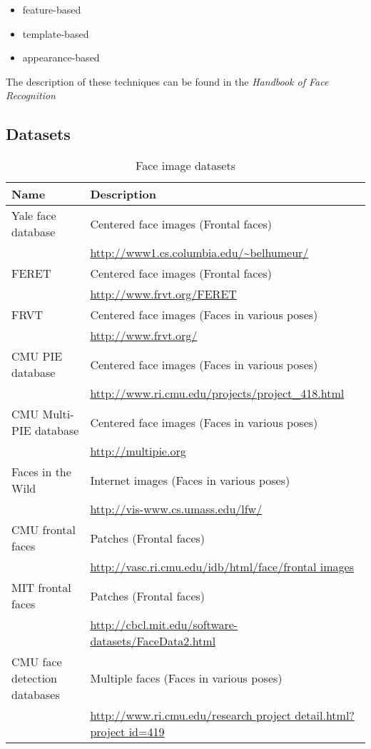 \documentclass[11pt]{article} %
\theoremstyle{plain}
\theoremstyle{definition}
\theoremstyle{remark}
\numberwithin{equation}{section} %
\numberwithin{figure}{section} %
\numberwithin{table}{section} %
\begin{document}
\begin{itemize}
  \item feature-based
  \item template-based
  \item appearance-based 
\end{itemize}

The description of these techniques can be found in the \emph{Handbook of Face Recognition} \citep{jain2005handbook}


\subsection{Datasets}

\begin{table}[H]
  \centering
  \caption{Face image datasets}
  \label{tab:datasets}
  \begin{tabular}{ l p{10cm} }
    Name & Description \\ 
    \hline
    Yale face database & Centered face images (Frontal faces) \\
    & \url{http://www1.cs.columbia.edu/~belhumeur/} \\
    FERET & Centered face images (Frontal faces) \\
    & \url{http://www.frvt.org/FERET} \\
    FRVT & Centered face images (Faces in various poses) \\
    & \url{http://www.frvt.org/} \\
    CMU PIE database & Centered face images (Faces in various poses) \\
    & \url{http://www.ri.cmu.edu/projects/project_418.html} \\
    CMU Multi-PIE database & Centered face images (Faces in various poses) \\
    & \url{http://multipie.org} \\
    Faces in the Wild & Internet images (Faces in various poses) \\
    & \url{http://vis-www.cs.umass.edu/lfw/} \\
    CMU frontal faces & Patches (Frontal faces) \\
    & \url{http://vasc.ri.cmu.edu/idb/html/face/frontal images} \\
    MIT frontal faces & Patches (Frontal faces) \\
    & \url{http://cbcl.mit.edu/software-datasets/FaceData2.html} \\
    CMU face detection databases & Multiple faces (Faces in various poses) \\
    & \url{http://www.ri.cmu.edu/research project detail.html?project id=419}
  \end{tabular}
\end{table}
\end{document}
